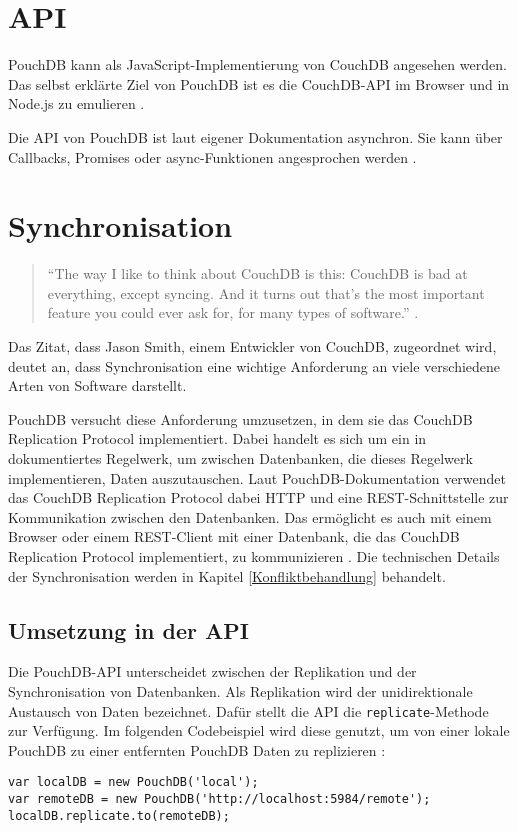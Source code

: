\section{API}
\label{API}
PouchDB kann als JavaScript-Implementierung von CouchDB angesehen werden. Das selbst erklärte Ziel von PouchDB ist es die CouchDB-API im Browser und in Node.js zu emulieren \cite{pouch:intro}. 

Die API von PouchDB ist laut eigener Dokumentation asynchron. Sie kann über Callbacks, Promises oder async-Funktionen angesprochen werden \cite{pouch:api}.


\section{Synchronisation}
\label{Synchronisation}
\begin{citeenv}
\begin{quotation}
"`The way I like to think about CouchDB is this: CouchDB is bad at everything, except syncing. And it turns out that's the most important feature you could ever ask for, for many types of software."' \cite{pouch:replication}.
\end{quotation}
\end{citeenv}

Das Zitat, dass Jason Smith, einem Entwickler von CouchDB, zugeordnet wird, deutet an, dass Synchronisation eine wichtige Anforderung an viele verschiedene Arten von Software darstellt.

PouchDB versucht diese Anforderung umzusetzen, in dem sie das CouchDB Replication Protocol implementiert. Dabei handelt es sich um ein in \cite{apache:replication} dokumentiertes Regelwerk, um zwischen Datenbanken, die dieses Regelwerk implementieren, Daten auszutauschen. Laut PouchDB-Dokumentation verwendet das CouchDB Replication Protocol dabei HTTP und eine REST-Schnittstelle zur Kommunikation zwischen den Datenbanken. Das ermöglicht es auch mit einem Browser oder einem REST-Client mit einer Datenbank, die das CouchDB Replication Protocol implementiert, zu kommunizieren \cite{pouch:intro}. Die technischen Details der Synchronisation werden in Kapitel \ref{Konfliktbehandlung} behandelt.


\subsection{Umsetzung in der API}
Die PouchDB-API unterscheidet zwischen der Replikation und der Synchronisation von Datenbanken. Als Replikation wird der unidirektionale Austausch von Daten bezeichnet. Dafür stellt die API die \texttt{replicate}-Methode zur Verfügung. Im folgenden Codebeispiel wird diese genutzt, um von einer lokale PouchDB zu einer entfernten PouchDB Daten zu replizieren \cite{pouch:replication}:
\begin{codebox}
\begin{lstlisting}[style=typescript]
var localDB = new PouchDB('local');
var remoteDB = new PouchDB('http://localhost:5984/remote');
localDB.replicate.to(remoteDB);
\end{lstlisting}
\end{codebox}


